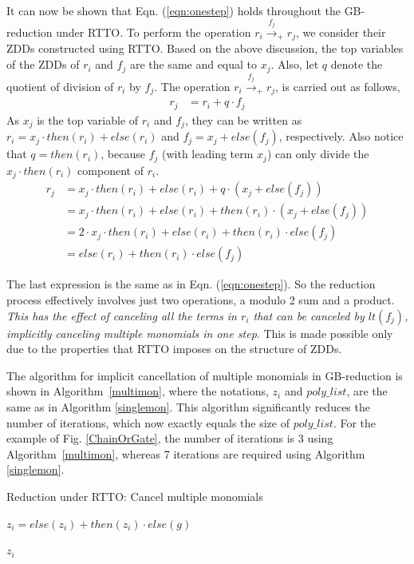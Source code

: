 \par It can now be shown that Eqn. (\ref{eqn:onestep})
holds throughout the GB-reduction under RTTO. To perform the operation
$r_i\xrightarrow{f_j}_+ r_j$, we consider their ZDDs constructed
using RTTO. Based on the above discussion, the top variables of the
ZDDs of $r_i$ and $f_j$ are the same and equal to $x_j$. Also, let $q$
denote the quotient of division of $r_i$ by $f_j$. The operation $r_i
\xrightarrow{f_j}_+ r_j$, is carried out as follows, 
\begin{align*}
r_j &= r_i + q\cdot f_j  
\end{align*}
As $x_j$ is the top variable of $r_i$ and $f_j$, they can be written
as $r_i = x_j\cdot then(r_i) + else(r_i)$ and $f_j = x_j + else(f_j)$,
respectively. Also notice that $q = then(r_i)$, because $f_j$ (with
leading term $x_j$) can only divide the $x_j\cdot then(r_i)$ component
of $r_i$. 
\begin{align*}
r_j &= x_j\cdot then(r_i) + else(r_i) + q\cdot(x_j + else(f_j)) \\
 &= x_j\cdot then(r_i) + else(r_i) + then(r_i)\cdot(x_j + else(f_j)) \\
 &= 2\cdot x_j\cdot then(r_i) + else(r_i) + then(r_i)\cdot else(f_j) \\
 &= else(r_i) + then(r_i)\cdot else(f_j)
\end{align*}
\par The last expression is the same as in
Eqn. (\ref{eqn:onestep}). So the reduction process effectively
involves just two operations, a modulo 2 sum and a product. {\it This
  has the effect of canceling all the terms in $r_i$ that can be
  canceled by $lt(f_j)$,  implicitly canceling multiple monomials in
  one step}.  This is made possible only due to the properties that
RTTO imposes on the structure of ZDDs. 

The algorithm for implicit cancellation of multiple monomials in
GB-reduction is shown in Algorithm~\ref{multimon}, where the notations,
$z_i$ and $poly\_list$, are the same as in Algorithm
\ref{singlemon}. This algorithm significantly
reduces the number of iterations, which now exactly equals the size of
$poly\_list$. For the example of Fig. \ref{ChainOrGate}, the number of
iterations is 3 using Algorithm~\ref{multimon}, whereas 7 iterations
are required using Algorithm \ref{singlemon}.


\begin{algorithm}
\caption{Reduction under RTTO: Cancel multiple monomials}
\label{multimon}
\begin{algorithmic}[1]
{\small
{}

\State $z_i = else(z_i) + then(z_i)\cdot else(g)$
\EndIf

\EndFor
\State \Return $z_i$
\EndProcedure
}
\end{algorithmic}
\end{algorithm}


